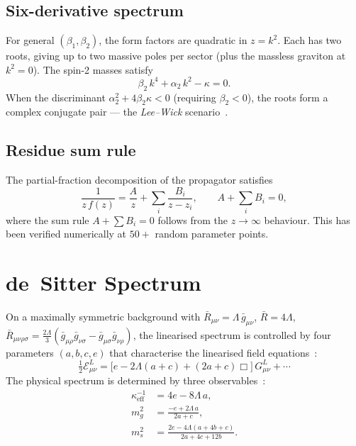 \documentclass[aps,prd,twocolumn,superscriptaddress,nofootinbib]{revtex4-2}
\begin{document}
\subsection{Six-derivative spectrum}

For general $(\beta_1, \beta_2)$, the form factors are quadratic in $z = k^2$.
Each has two roots, giving up to two massive poles per sector (plus the
massless graviton at $k^2 = 0$).  The spin-2 masses satisfy
\begin{equation}
\beta_2\,k^4 + \alpha_2\,k^2 - \kappa = 0.
\end{equation}
When the discriminant $\alpha_2^2 + 4\beta_2\kappa < 0$ (requiring
$\beta_2 < 0$), the roots form a complex conjugate pair --- the
\emph{Lee--Wick} scenario~\cite{Buoninfante2020}.

\subsection{Residue sum rule}

The partial-fraction decomposition of the propagator satisfies~\cite{Buoninfante2020}
\begin{equation}
\frac{1}{z\,f(z)} = \frac{A}{z} + \sum_i \frac{B_i}{z - z_i},
\qquad A + \sum_i B_i = 0,
\end{equation}
where the sum rule $A + \sum B_i = 0$ follows from the $z\to\infty$
behaviour. This has been verified numerically at $50{+}$ random
parameter points.

\section{de~Sitter Spectrum}
\label{sec:dS}

On a maximally symmetric background with
$\bar R_{\mu\nu} = \Lambda\, \bar g_{\mu\nu}$,
$\bar R = 4\Lambda$,
$\bar R_{\mu\nu\rho\sigma} = \tfrac{2\Lambda}{3}(\bar g_{\mu\rho}\bar g_{\nu\sigma} - \bar g_{\mu\sigma}\bar g_{\nu\rho})$,
the linearised spectrum is controlled by four parameters
$(a,b,c,e)$ that characterise the linearised field
equations~\cite{BuenoCano2016}:
\begin{equation}\label{eq:linearised}
\tfrac{1}{2}\mathcal{E}^L_{\mu\nu}
= \bigl[e - 2\Lambda(a+c) + (2a{+}c)\Box\bigr]\,G^L_{\mu\nu} + \cdots
\end{equation}
The physical spectrum is determined by three
observables~\cite{BuenoCano2016}:
\begin{align}
\kappa_\mathrm{eff}^{-1} &= 4e - 8\Lambda\,a,
  \label{eq:keff}\\
m_g^2 &= \frac{-e + 2\Lambda\,a}{2a + c},
  \label{eq:mg}\\
m_s^2 &= \frac{2e - 4\Lambda(a + 4b + c)}{2a + 4c + 12b}.
  \label{eq:ms}
\end{align}
\end{document}
